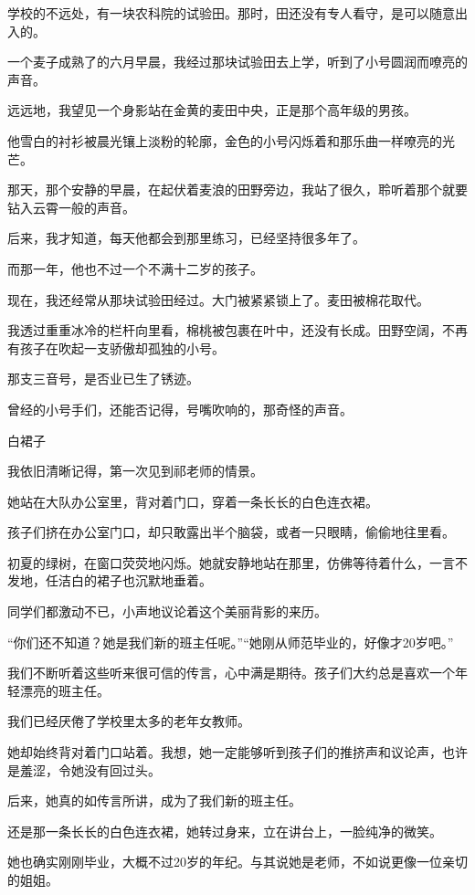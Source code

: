 \documentclass[12pt,a4paper]{article}
\newcommand{\subpart}[1]{
	\begingroup \par
	\vspace{1ex} \centering #1
	\par \endgroup
}
\begin{document}
		学校的不远处，有一块农科院的试验田。那时，田还没有专人看守，是可以随意出入的。\par
		一个麦子成熟了的六月早晨，我经过那块试验田去上学，听到了小号圆润而嘹亮的声音。\par
		远远地，我望见一个身影站在金黄的麦田中央，正是那个高年级的男孩。\par
		他雪白的衬衫被晨光镶上淡粉的轮廓，金色的小号闪烁着和那乐曲一样嘹亮的光芒。

		那天，那个安静的早晨，在起伏着麦浪的田野旁边，我站了很久，聆听着那个就要钻入云霄一般的声音。

		后来，我才知道，每天他都会到那里练习，已经坚持很多年了。\par
		而那一年，他也不过一个不满十二岁的孩子。

		现在，我还经常从那块试验田经过。大门被紧紧锁上了。麦田被棉花取代。\par
		我透过重重冰冷的栏杆向里看，棉桃被包裹在叶中，还没有长成。田野空阔，不再有孩子在吹起一支骄傲却孤独的小号。

		那支三音号，是否业已生了锈迹。\par
		曾经的小号手们，还能否记得，号嘴吹响的，那奇怪的声音。

		\subpart{白裙子}

		我依旧清晰记得，第一次见到祁老师的情景。

		她站在大队办公室里，背对着门口，穿着一条长长的白色连衣裙。

		孩子们挤在办公室门口，却只敢露出半个脑袋，或者一只眼睛，偷偷地往里看。\par
		初夏的绿树，在窗口荧荧地闪烁。她就安静地站在那里，仿佛等待着什么，一言不发地，任洁白的裙子也沉默地垂着。

		同学们都激动不已，小声地议论着这个美丽背影的来历。\par
		“你们还不知道？她是我们新的班主任呢。”“她刚从师范毕业的，好像才20岁吧。”\par
		我们不断听着这些听来很可信的传言，心中满是期待。孩子们大约总是喜欢一个年轻漂亮的班主任。\par
		我们已经厌倦了学校里太多的老年女教师。

		她却始终背对着门口站着。我想，她一定能够听到孩子们的推挤声和议论声，也许是羞涩，令她没有回过头。\par
		后来，她真的如传言所讲，成为了我们新的班主任。\par
		还是那一条长长的白色连衣裙，她转过身来，立在讲台上，一脸纯净的微笑。\par
		她也确实刚刚毕业，大概不过20岁的年纪。与其说她是老师，不如说更像一位亲切的姐姐。
\end{document}
